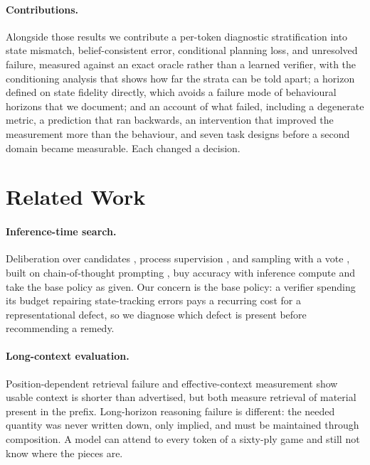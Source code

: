\documentclass[11pt]{article}
\theoremstyle{remark}
\begin{document}
\paragraph{Contributions.}
Alongside those results we contribute a per-token diagnostic stratification into state mismatch,
belief-consistent error, conditional planning loss, and unresolved failure,
measured against an exact oracle rather than a learned verifier, with the
conditioning analysis that shows how far the strata can be told apart; a horizon
defined on state fidelity directly, which avoids a failure mode of behavioural
horizons that we document; and an account of what failed, including a degenerate
metric, a prediction that ran backwards, an intervention that improved the
measurement more than the behaviour, and seven task designs before a second
domain became measurable. Each changed a decision.

\section{Related Work}

\paragraph{Inference-time search.}
Deliberation over candidates \citep{yao2023tree}, process supervision
\citep{lightman2024lets}, and sampling with a vote
\citep{wang2023selfconsistency}, built on chain-of-thought prompting
\citep{wei2022chain}, buy accuracy with inference compute and take the base
policy as given. Our concern is the base policy: a verifier spending its budget
repairing state-tracking errors pays a recurring cost for a representational
defect, so we diagnose which defect is present before recommending a remedy.

\paragraph{Long-context evaluation.}
Position-dependent retrieval failure \citep{liu2024lost} and effective-context
measurement \citep{hsieh2024ruler} show usable context is shorter than advertised,
but both measure retrieval of material present in the prefix. Long-horizon
reasoning failure is different: the needed quantity was never written down, only
implied, and must be maintained through composition. A model can attend to every
token of a sixty-ply game and still not know where the pieces are.
\end{document}

